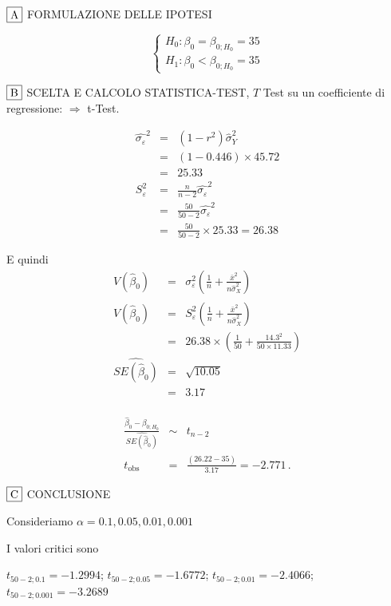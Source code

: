 \documentclass[
  11pt,
]{book}
\theoremstyle{mytheoremstyle}
\theoremstyle{mydefstyle}
\newenvironment{sol}
  {
  \begin{tcolorbox}[enhanced,breakable,arc=0.1mm,boxrule=1pt,colback=white,colframe=iblue,
  title=\bf \fontfamily{lmss}\selectfont \hspace{.5 cm} Soluzione,drop fuzzy shadow]

}{
\end{tcolorbox}
  }
\begin{document}
\begin{sol}
\(\fbox{A}\) FORMULAZIONE DELLE IPOTESI

\[\begin{cases}
   H_0: \beta_0 = \beta_{0;H_0}=35 \\
   H_1: \beta_0 < \beta_{0;H_0}=35 
   \end{cases}\]

\(\fbox{B}\) SCELTA E CALCOLO STATISTICA-TEST, \(T\)
Test su un coefficiente di regressione: \(\Rightarrow\) t-Test.

\begin{eqnarray*}
\hat{\sigma_\varepsilon}^2&=&(1-r^2)\hat\sigma_Y^2\\
&=& (1- 0.446 )\times 45.72 \\
   &=&  25.33 \\
   S_\varepsilon^2 &=& \frac{n} {n-2} \hat{\sigma_\varepsilon}^2\\
   &=&  \frac{ 50 } { 50 -2} \hat{\sigma_\varepsilon}^2 \\
 &=&  \frac{ 50 } { 50 -2} \times  25.33  =  26.38  
\end{eqnarray*}

E quindi\begin{eqnarray*}
V(\hat\beta_{0}) &=& \sigma_{\varepsilon}^{2} \left( \frac{1} {n}  +  \frac{\bar{x}^{2}} {n \hat{\sigma}^{2}_{X}} \right)\\
\widehat{V(\hat\beta_{0})} &=& S_{\varepsilon}^{2}\left( \frac{1} {n}  +  \frac{\bar{x}^{2}} {n \hat{\sigma}^{2}_{X}} \right)\ \\
 &=&  26.38 \times\left( \frac{1} { 50 }  +  \frac{ 14.3 ^{2}} { 50 \times  11.33 } \right)\\
 \widehat{SE(\hat\beta_{0})}        &=&  \sqrt{ 10.05 }\\
 &=&  3.17 
\end{eqnarray*}\\
\begin{eqnarray*}
 \frac{\hat\beta_{ 0 } - \beta_{ 0 ;H_0}} {\widehat{SE(\hat\beta_{ 0 })}}&\sim&t_{n-2}\\
   t_{\text{obs}}
&=& \frac{ ( 26.22 -  35 )} { 3.17 }
 =   -2.771 \, .
\end{eqnarray*}

\(\fbox{C}\) CONCLUSIONE

Consideriamo \(\alpha=0.1, 0.05, 0.01, 0.001\)

I valori critici sono

\(t_{50-2;0.1}=-1.2994\); \(t_{50-2;0.05}=-1.6772\); \(t_{50-2;0.01}=-2.4066\); \(t_{50-2;0.001}=-3.2689\)


\end{sol}
\end{document}
